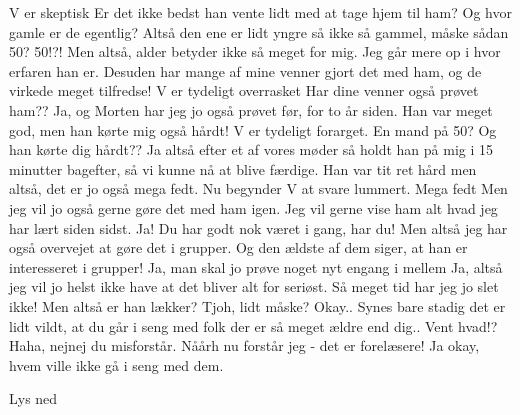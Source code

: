 \documentclass[a4paper,11pt]{article}
\begin{document}
\begin{sketch}
\scene V er skeptisk
 Er det ikke bedst han vente lidt med at tage hjem til ham? Og hvor gamle er de egentlig?
 Altså den ene er lidt yngre så ikke så gammel, måske sådan 50?
 50!?!
 Men altså, alder betyder ikke så meget for mig. Jeg går mere op i hvor erfaren han er. Desuden har mange af mine venner gjort det med ham, og de virkede meget tilfredse!
\scene V er tydeligt overrasket
Har dine venner også prøvet ham??
 Ja, og Morten har jeg jo også prøvet før, for to år siden. Han var meget god, men han kørte mig også hårdt!
\scene V er tydeligt forarget.
 En mand på 50? Og han kørte dig hårdt??
 Ja altså efter et af vores møder så holdt han på mig i 15 minutter bagefter, så vi kunne nå at blive færdige. Han var tit ret hård men altså, det er jo også mega fedt.
\scene Nu begynder V at svare lummert.
 Mega fedt 
 Men jeg vil jo også gerne gøre det med ham igen. Jeg vil gerne vise ham alt hvad jeg har lært siden sidst.
 Ja! Du har godt nok været i gang, har du!
 Men altså jeg har også overvejet at gøre det i grupper. Og den ældste af dem siger, at han er interesseret i grupper!
 Ja, man skal jo prøve noget nyt engang i mellem
 Ja, altså jeg vil jo helst ikke have at det bliver alt for seriøst. Så meget tid har jeg jo slet ikke!
 Men altså er han lækker?
 Tjoh, lidt måske? 
 Okay.. Synes bare stadig det er lidt vildt, at du går i seng med folk der er så meget ældre end dig..
 Vent hvad!? Haha, nejnej du misforstår.
 Nåårh nu forstår jeg - det er forelæsere! Ja okay, hvem ville ikke gå i seng med dem. 

\scene Lys ned
\end{sketch}
\end{document}
